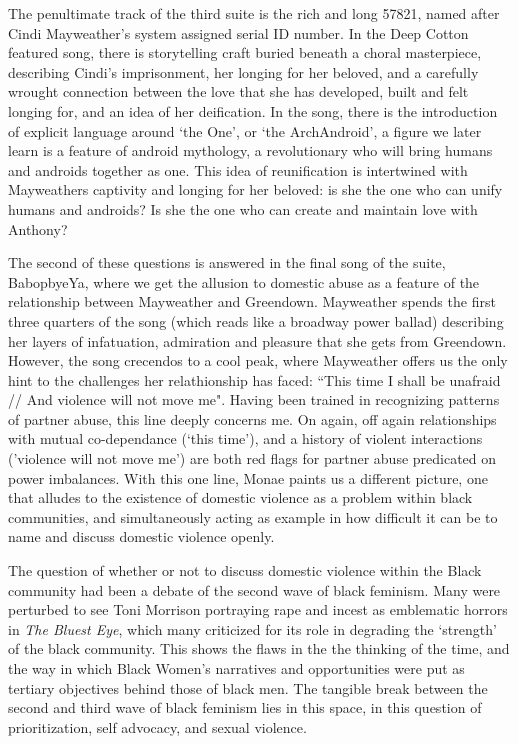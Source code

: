 \documentclass[a4paper, 11pt]{article} %
\begin{document}
The penultimate track of the third suite is the rich and long 57821, named after Cindi Mayweather's system assigned serial ID number.
In the Deep Cotton featured song, there is storytelling craft buried beneath a choral masterpiece, describing Cindi's imprisonment, her longing for her beloved, and a carefully wrought connection between the love that she has developed, built and felt longing for, and an idea of her deification.
In the song, there is the introduction of explicit language around `the One', or `the ArchAndroid', a figure we later learn is a feature of android mythology, a revolutionary who will bring humans and androids together as one.
This idea of reunification is intertwined with Mayweathers captivity and longing for her beloved: is she the one who can unify humans and androids? Is she the one who can create and maintain love with Anthony?

The second of these questions is answered in the final song of the suite, BabopbyeYa, where we get the allusion to domestic abuse as a feature of the relationship between Mayweather and Greendown.
Mayweather spends the first three quarters of the song (which reads like a broadway power ballad) describing her layers of infatuation, admiration and pleasure that she gets from Greendown.
However, the song crecendos to a cool peak, where Mayweather offers us the only hint to the challenges her relathionship has faced: ``This time I shall be unafraid // And violence will not move me"\cite{babopbyeya}.
Having been trained in recognizing patterns of partner abuse, this line deeply concerns me.
On again, off again relationships with mutual co-dependance (`this time'), and a history of violent interactions ('violence will not move me') are both red flags for partner abuse predicated on power imbalances.
With this one line, Monae paints us a different picture, one that alludes to the existence of domestic violence as a problem within black communities, and simultaneously acting as example in how difficult it can be to name and discuss domestic violence openly. 

The question of whether or not to discuss domestic violence within the Black community had been a debate of the second wave of black feminism.
Many were perturbed to see Toni Morrison portraying rape and incest as emblematic horrors in \emph{The Bluest Eye}, which many criticized for its role in degrading the `strength' of the black community.
This shows the flaws in the the thinking of the time, and the way in which Black Women's narratives and opportunities were put as tertiary objectives behind those of black men.
The tangible break between the second and third wave of black feminism lies in this space, in this question of prioritization, self advocacy, and sexual violence.
\end{document}
